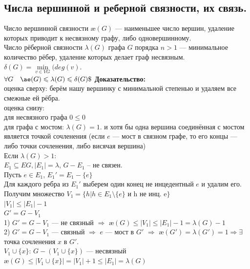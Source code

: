 \documentclass[12pt]{article}
\begin{document}
\subsection{Числа вершинной и реберной связности, их связь.}
	Число вершинной связности $æ(G)$ — наименьшее число вершин, удаление которых приводит к несвязному графу, либо одновершинному.\\
	Число рёберной связности $\lambda(G)$ графа $G$ порядка $n>1$ — минимальное количество рёбер, удаление которых делает граф несвязным.\\
	$\delta(G) = \underset{v \in VG}{\min}(deg(v)$.\\
	$\forall G \quad æ(G) \leqslant \lambda(G) \leqslant \delta(G)\$\\$
	\textbf{Доказательство:}\\
		оценка сверху: берём нашу вершинку с минимальной степенью и удаляем все смежные ей рёбра.\\
		оценка снизу:\\
		для несвязного графа $0 \leqslant 0$\\
		для графа с мостом: $\lambda(G) = 1$. и хотя бы одна вершина соединённая с мостом является точкой сочленения (если $e$ — мост в связном графе, то его концы — либо точки сочленения, либо висячая вершина)\\
		Если $\lambda(G) > 1$:\\
		$E_1 \subseteq EG,|E_1| = \lambda$, $G-E_1$ – не связен.\\
		Пусть $e \in E_1$, $E_1' = 	E_1 - \{e\}$\\
		Для каждого ребра из $E_1'$ выберем один конец не инцедентный $e$ и удалим его.\\
		Получим множество $V_1 = \{h | h \in E_1 \setminus \{e\}\text{ и h не инц. e}\}$\\
		$|V_1| \leqslant |E_1| - 1$\\
		$G' = G - V_1$\\
		1) $G' = G - V_1$ — не связный $\Rightarrow$ $æ(G) \leqslant |V_1| \leqslant |E_1| - 1 = \lambda(G) - 1$\\
		2) $G' = G - V_1$ — связный $\Rightarrow$ $e$ — мост в $G'$ $\Rightarrow$ $æ(G') = \lambda(G') = 1 \Rightarrow \exists$ точка сочленения $x$  в $G'$.\\
		$V_1 \cup \{x\}$: $G - (V_1 \cup \{x\})$ — несвязный\\
		$æ(G) \leqslant |V_1 \cup \{x\}| = |V_1| + 1 \leqslant |E_1| = \lambda(G)$\\
	\qedsymbol
\end{document}
